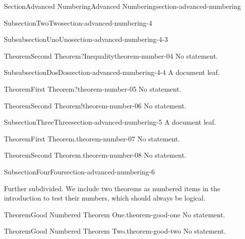 \documentclass[twoside,10pt,]{article}
\numberwithin{equation}{section}
\begin{document}
\begin{sectionptx}{Section}{Advanced Numbering}{}{Advanced Numbering}{}{}{section-advanced-numbering}
\begin{subsectionptx}{Subsection}{Two}{}{Two}{}{}{section-advanced-numbering-4}
\begin{subsubsectionptx}{Subsubsection}{Uno}{}{Uno}{}{}{section-advanced-numbering-4-3}
\begin{theorem}{Theorem}{Second Theorem?}{Inequality}{theorem-number-04}
No statement.%
\end{theorem}
\end{subsubsectionptx}
%
%
\typeout{************************************************}
\typeout{************************************************}
%
\begin{subsubsectionptx}{Subsubsection}{Dos}{}{Dos}{}{}{section-advanced-numbering-4-4}
A document leaf.%
\begin{theorem}{Theorem}{First Theorem?}{}{theorem-number-05}%
No statement.%
\end{theorem}
\begin{theorem}{Theorem}{Second Theorem!}{}{theorem-number-06}%
No statement.%
\end{theorem}
\end{subsubsectionptx}
\end{subsectionptx}
%
%
\typeout{************************************************}
\typeout{************************************************}
%
\begin{subsectionptx}{Subsection}{Three}{}{Three}{}{}{section-advanced-numbering-5}
A document leaf.%
\begin{theorem}{Theorem}{First Theorem.}{}{theorem-number-07}%
No statement.%
\end{theorem}
\begin{theorem}{Theorem}{Second Theorem.}{}{theorem-number-08}%
No statement.%
\end{theorem}
\end{subsectionptx}
%
%
\typeout{************************************************}
\typeout{************************************************}
%
\begin{subsectionptx}{Subsection}{Four}{}{Four}{}{}{section-advanced-numbering-6}
\begin{introduction}{}%
Further subdivided.  We include two theorems as numbered items in the introduction to test their numbers, which should always be logical.%
\begin{theorem}{Theorem}{Good Numbered Theorem One.}{}{theorem-good-one}%
No statement.%
\end{theorem}
\begin{theorem}{Theorem}{Good Numbered Theorem Two.}{}{theorem-good-two}%
No statement.%
\end{theorem}
\end{introduction}%
%
%
\typeout{************************************************}

\end{subsectionptx}
\end{sectionptx}
\end{document}

